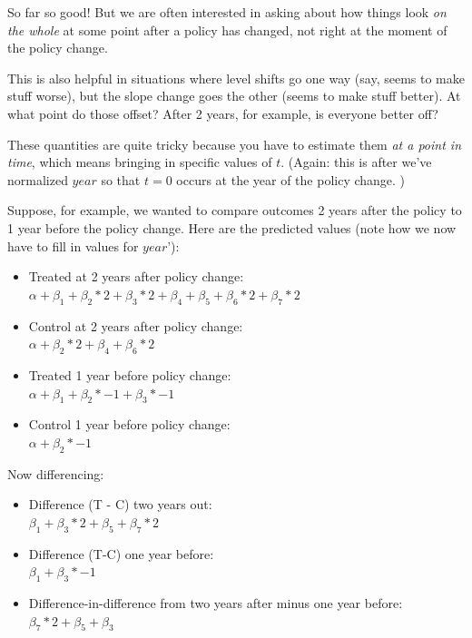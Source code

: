 \documentclass[12pt]{article}
\begin{document}
So far so good! But we are often interested in asking about how things look \emph{on the whole} at some point after a policy has changed, not right at the moment of the policy change.

This is also helpful in situations where level shifts go one way (say, seems to make stuff worse), but the slope change goes the other (seems to make stuff better). At what point do those offset? After 2 years, for example, is everyone better off?

These quantities are quite tricky because you have to estimate them \emph{at a point in time}, which means bringing in specific values of $t$. (Again: this is after we've normalized $year$ so that $t=0$ occurs at the year of the policy change. )

Suppose, for example, we wanted to compare outcomes 2 years after the policy to 1 year before the policy change. Here are the predicted values (note how we now have to fill in values for $year$'):

\begin{itemize}
  \item Treated at 2 years after policy change: \\
  $\alpha + \beta_1 + \beta_2 * 2 + \beta_3 * 2 + \beta_4 + \beta_5 + \beta_6 * 2 + \beta_7 * 2$
  \item Control at 2 years after policy change: \\
  $\alpha + \beta_2 * 2 + \beta_4 + \beta_6 * 2$
  \item Treated 1 year before policy change: \\
  $\alpha + \beta_1 + \beta_2 * -1 + \beta_3 * -1$
  \item Control 1 year before policy change: \\
  $\alpha + \beta_2 * -1$
\end{itemize}

Now differencing:

\begin{itemize}
  \item Difference (T - C) two years out: \\
  $\beta_1  + \beta_3 * 2+ \beta_5 + \beta_7 * 2$
  \item Difference (T-C) one year before: \\
  $\beta_1  + \beta_3 * -1$
  \item Difference-in-difference from two years after minus one year before: \\
  $\beta_7 * 2 + \beta_5 + \beta_3$
\end{itemize}
\end{document}
